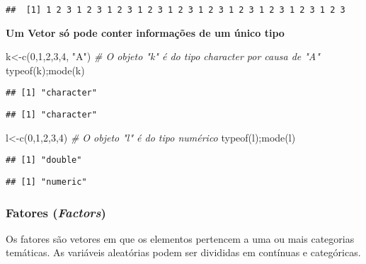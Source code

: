 \documentclass[
]{book}
\newenvironment{Shaded}{\begin{snugshade}}{\end{snugshade}}
\newcommand{\CommentTok}[1]{\textcolor[rgb]{0.56,0.35,0.01}{\textit{#1}}}
\newcommand{\DecValTok}[1]{\textcolor[rgb]{0.00,0.00,0.81}{#1}}
\newcommand{\FunctionTok}[1]{\textcolor[rgb]{0.00,0.00,0.00}{#1}}
\newcommand{\NormalTok}[1]{#1}
\newcommand{\OtherTok}[1]{\textcolor[rgb]{0.56,0.35,0.01}{#1}}
\newcommand{\StringTok}[1]{\textcolor[rgb]{0.31,0.60,0.02}{#1}}
\begin{document}
\begin{verbatim}
##  [1] 1 2 3 1 2 3 1 2 3 1 2 3 1 2 3 1 2 3 1 2 3 1 2 3 1 2 3 1 2 3
\end{verbatim}

\textbf{Um Vetor só pode conter informações de um único tipo}

\begin{Shaded}
\begin{Highlighting}[]
\NormalTok{k}\OtherTok{\textless{}{-}}\FunctionTok{c}\NormalTok{(}\DecValTok{0}\NormalTok{,}\DecValTok{1}\NormalTok{,}\DecValTok{2}\NormalTok{,}\DecValTok{3}\NormalTok{,}\DecValTok{4}\NormalTok{, }\StringTok{"A"}\NormalTok{) }\CommentTok{\# O objeto "k" é do tipo character por causa de "A"}
\FunctionTok{typeof}\NormalTok{(k);}\FunctionTok{mode}\NormalTok{(k)}
\end{Highlighting}
\end{Shaded}

\begin{verbatim}
## [1] "character"
\end{verbatim}

\begin{verbatim}
## [1] "character"
\end{verbatim}

\begin{Shaded}
\begin{Highlighting}[]
\NormalTok{l}\OtherTok{\textless{}{-}}\FunctionTok{c}\NormalTok{(}\DecValTok{0}\NormalTok{,}\DecValTok{1}\NormalTok{,}\DecValTok{2}\NormalTok{,}\DecValTok{3}\NormalTok{,}\DecValTok{4}\NormalTok{) }\CommentTok{\# O objeto "l" é do tipo numérico}
\FunctionTok{typeof}\NormalTok{(l);}\FunctionTok{mode}\NormalTok{(l)}
\end{Highlighting}
\end{Shaded}

\begin{verbatim}
## [1] "double"
\end{verbatim}

\begin{verbatim}
## [1] "numeric"
\end{verbatim}

\hypertarget{fatores-factors}{%
\subsubsection{\texorpdfstring{Fatores (\emph{Factors})}{Fatores (Factors)}}\label{fatores-factors}}

Os fatores são vetores em que os elementos pertencem a uma ou mais categorias temáticas.
As variáveis aleatórias podem ser divididas em contínuas e categóricas.
\end{document}

